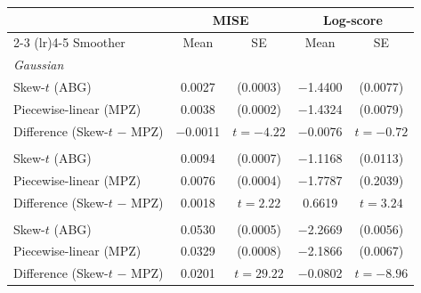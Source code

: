 \documentclass[12pt]{report} %
\begin{document}
\begin{table}[htbp]
	{\small
	\begin{tabular}{lcccc}
		\toprule
		& \multicolumn{2}{c}{MISE} & \multicolumn{2}{c}{Log-score} \\
		\cmidrule(lr){2-3} \cmidrule(lr){4-5}
		Smoother & Mean & SE & Mean & SE \\
		\midrule
		\multicolumn{5}{l}{\textit{Gaussian}} \\
		Skew-$t$ (ABG) & 0.0027 & (0.0003) & $-$1.4400 & (0.0077) \\
		Piecewise-linear (MPZ) & 0.0038 & (0.0002) & $-$1.4324 & (0.0079) \\
		Difference (Skew-$t$ $-$ MPZ) & $-$0.0011 & $t = -4.22$ & $-$0.0076 & $t = -0.72$ \\
		\addlinespace
		\multicolumn{5}{l}{\textit{Skew-$t$}} \\
		Skew-$t$ (ABG) & 0.0094 & (0.0007) & $-$1.1168 & (0.0113) \\
		Piecewise-linear (MPZ) & 0.0076 & (0.0004) & $-$1.7787 & (0.2039) \\
		Difference (Skew-$t$ $-$ MPZ) & 0.0018 & $t = 2.22$ & 0.6619 & $t = 3.24$ \\
		\addlinespace
		\multicolumn{5}{l}{\textit{Bimodal mixture}} \\
		Skew-$t$ (ABG) & 0.0530 & (0.0005) & $-$2.2669 & (0.0056) \\
		Piecewise-linear (MPZ) & 0.0329 & (0.0008) & $-$2.1866 & (0.0067) \\
		Difference (Skew-$t$ $-$ MPZ) & 0.0201 & $t = 29.22$ & $-$0.0802 & $t = -8.96$ \\
		\bottomrule
	\end{tabular}}
\end{table}
\end{document}
